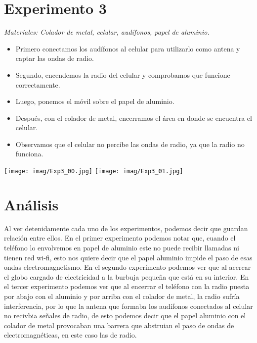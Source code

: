 \documentclass[]{article}
\newenvironment{Figura}
  {\par\medskip\noindent\minipage{\linewidth}}
  {\endminipage\par\medskip}
\begin{document}
\begin{multicols*}{2}[\setlength{columnsep}{3cm}]
\section*{Experimento 3}
\textit{Materiales: Colador de metal, celular, audífonos, papel de aluminio.}
    \begin{itemize}
        \item Primero conectamos los audífonos al celular para utilizarlo como antena y captar las ondas de radio.
        \item Segundo, encendemos la radio del celular y comprobamos que funcione correctamente.
        \item Luego, ponemos el móvil sobre el papel de aluminio.
        \item Después, con el colador de metal, encerramos el área en donde se encuentra el celular.
        \item Observamos que el celular no percibe las ondas de radio, ya que la radio no funciona.
    \end{itemize}

\begin{Figura}
    \centering
    \texttt{[image: imag/Exp3\_00.jpg]}
    \texttt{[image: imag/Exp3\_01.jpg]}
\end{Figura}


    
\section*{Análisis}
Al ver detenidamente cada uno de los experimentos, podemos decir que guardan relación entre ellos.
En el primer experimento podemos notar que, cuando el teléfono lo envolvemos en papel de aluminio este no puede recibir llamadas ni tienen red wi-fi, esto nos quiere decir que el papel aluminio impide el paso de esas ondas electromagnetismo.
En el segundo experimento podemos ver que al acercar el globo cargado de electricidad a la burbuja pequeña que está en su interior.
En el tercer experimento podemos ver que al encerrar el teléfono con la radio puesta por abajo con el aluminio y por arriba con el colador de metal, la radio sufría interferencia, por lo que la antena que formaba los audífonos conectados al celular no recivbia señales de radio, de esto podemos decir que el papel aluminio con el colador de metal provocaban una barrera que abstruian el paso de ondas de electromagnéticas, en este caso las de radio.



\end{multicols*}
\end{document}
